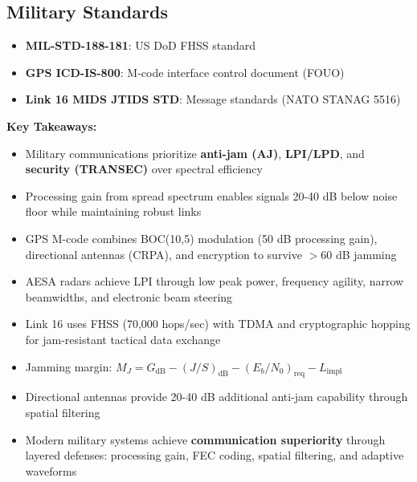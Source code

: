\subsection{Military Standards}

\begin{itemize}
\item \textbf{MIL-STD-188-181}: US DoD FHSS standard
\item \textbf{GPS ICD-IS-800}: M-code interface control document (FOUO)
\item \textbf{Link 16 MIDS JTIDS STD}: Message standards (NATO STANAG 5516)
\end{itemize}

\textbf{Key Takeaways:}

\begin{itemize}
\item Military communications prioritize \textbf{anti-jam (AJ)}, \textbf{LPI/LPD}, and \textbf{security (TRANSEC)} over spectral efficiency
\item Processing gain from spread spectrum enables signals 20-40 dB below noise floor while maintaining robust links
\item GPS M-code combines BOC(10,5) modulation (50 dB processing gain), directional antennas (CRPA), and encryption to survive $>60$ dB jamming
\item AESA radars achieve LPI through low peak power, frequency agility, narrow beamwidths, and electronic beam steering
\item Link 16 uses FHSS (70,000 hops/sec) with TDMA and cryptographic hopping for jam-resistant tactical data exchange
\item Jamming margin: $M_J = G_{\text{dB}} - (J/S)_{\text{dB}} - (E_b/N_0)_{\text{req}} - L_{\text{impl}}$
\item Directional antennas provide 20-40 dB additional anti-jam capability through spatial filtering
\item Modern military systems achieve \textbf{communication superiority} through layered defenses: processing gain, FEC coding, spatial filtering, and adaptive waveforms
\end{itemize}
